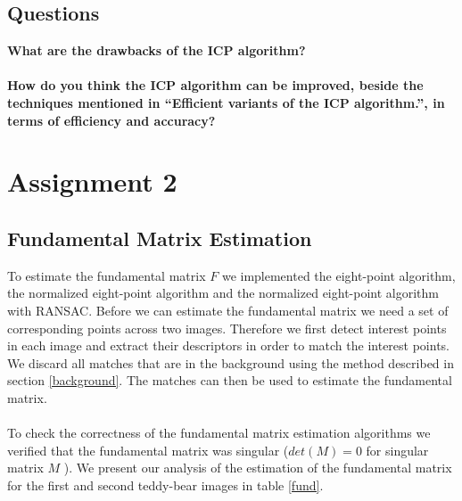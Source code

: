 \documentclass[12pt]{amsart}
\begin{document}
\subsection{Questions}
\textbf{What are the drawbacks of the ICP algorithm?}\\\\
\textbf{How do you think the ICP algorithm can be improved, beside the techniques mentioned in ``Efficient variants of the ICP algorithm.'', in terms of efficiency and accuracy?}

\section{Assignment 2}
\subsection{Fundamental Matrix Estimation}
To estimate the fundamental matrix $F$ we implemented the eight-point algorithm, the normalized eight-point algorithm and the normalized eight-point algorithm with RANSAC. Before we can estimate the fundamental matrix we need a set of corresponding points across two images. Therefore we first detect interest points in each image and extract their descriptors in order to match the interest points. We discard all matches that are in the background using the method described in section \ref{background}. The matches can then be used to estimate the fundamental matrix. \\\\
To check the correctness of the fundamental matrix estimation algorithms we verified that the fundamental matrix was singular ($\textit{det}(M) = 0$ for singular matrix $M$ ). We present our analysis of the estimation of the fundamental matrix for the first and second teddy-bear images in table \ref{fund}.
\end{document}
